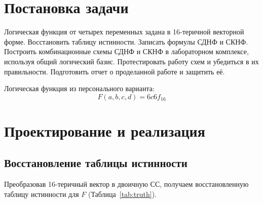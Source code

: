 \documentclass[a4paper]{article}
\author{Буренин А.А}
\begin{document}

    \tableofcontents{}

    \clearpage


    \section{Постановка задачи}\label{sec:introduction}
    Логическая функция от четырех переменных задана в 16-теричной векторной форме.
    Восстановить таблицу истинности. Записать формулы СДНФ и СКНФ. Построить комбинационные
    схемы СДНФ и СКНФ в лабораторном комплексе, используя общий логический базис.
    Протестировать работу схем и убедиться в их правильности. Подготовить отчет о проделанной
    работе и защитить её.

    Логическая функция из персонального варианта:
    \[ F(a, b, c, d) = 6c6f_{16} \]


    \section{Проектирование и реализация}\label{sec:implementation}

    \subsection{Восстановление таблицы истинности}\label{subsec:table-recovering}
    Преобразовав 16-теричный вектор в двоичную СС, получаем восстановленную таблицу
    истинности для $ F $ (Таблица~\ref{tab:truth}).
\end{document}
